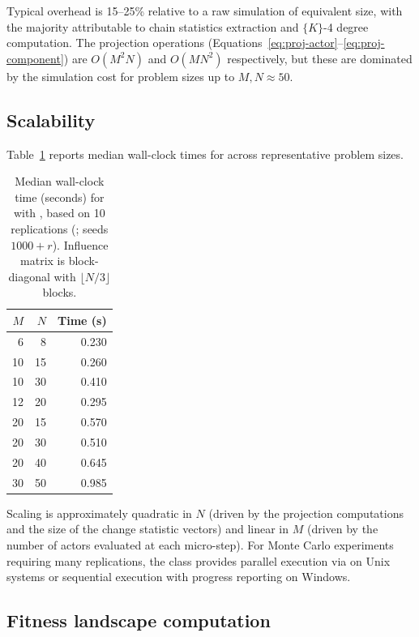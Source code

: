 \documentclass[
  article]{jss}
\begin{document}
Typical overhead is 15--25\% relative to a raw  simulation
of equivalent size, with the majority attributable to chain statistics
extraction and \(\{K\}\)-4 degree computation. The projection operations
(Equations~\ref{eq:proj-actor}--\ref{eq:proj-component}) are
\(O(M^2 N)\) and \(O(M N^2)\) respectively, but these are dominated by
the  simulation cost for problem sizes up to
\(M, N \approx 50\).

\subsection{Scalability}\label{scalability}

Table~\ref{tab:scalability} reports median wall-clock times for
 across representative problem sizes.

\begin{table}[t]
\centering
\begin{tabular}{rrr}
\toprule
$M$ & $N$ & Time (s) \\
\midrule
 6  &  8  &  0.230 \\
10  & 15  &  0.260 \\
10  & 30  &  0.410 \\
12  & 20  &  0.295 \\
20  & 15  &  0.570 \\
20  & 30  &  0.510 \\
20  & 40  &  0.645 \\
30  & 50  &  0.985 \\
\bottomrule
\end{tabular}
\caption{Median wall-clock time (seconds) for  with
, based on 10 replications
(; seeds $1000 + r$).  Influence matrix is
block-diagonal with $\lfloor N/3 \rfloor$ blocks.}
\label{tab:scalability}
\end{table}

Scaling is approximately quadratic in \(N\) (driven by the projection
computations and the size of the  change statistic vectors)
and linear in \(M\) (driven by the number of actors evaluated at each
micro-step). For Monte Carlo experiments requiring many replications,
the  class provides parallel execution via
 on Unix systems or sequential execution with
progress reporting on Windows.

\subsection{Fitness landscape
computation}\label{fitness-landscape-computation}
\end{document}
